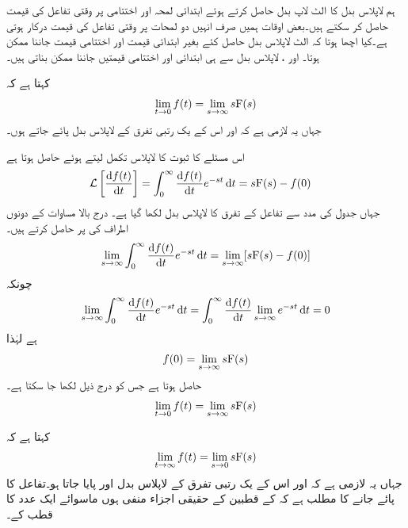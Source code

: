 ہم لاپلاس بدل  کا الٹ لاپ بدل  حاصل کرتے ہوئے ابتدائی لمحہ  اور اختتامی  پر وقتی تفاعل کی قیمت حاصل کر سکتے ہیں۔بعض اوقات ہمیں صرف انہیں دو لمحات پر وقتی تفاعل کی قیمت درکار ہوتی ہے۔کیا اچھا ہوتا کہ الٹ لاپلاس بدل حاصل کئے بغیر ابتدائی قیمت اور اختتامی قیمت جاننا ممکن ہوتا۔ اور ، لاپلاس بدل سے ہی ابتدائی اور اختتامی قیمتیں جاننا ممکن بناتی ہیں۔

 کہتا ہے  کہ
\begin{align}
\lim_{t \to 0} f(t)=\lim_{s \to \infty} s{{\textup{F}}}(s)
\end{align}
جہاں یہ لازمی ہے کہ   اور اس کے یک رتبی تفرق  کے لاپلاس بدل پائے جاتے ہوں۔

اس مسئلے کا ثبوت  کا لاپلاس تکمل لیتے ہوئے حاصل ہوتا ہے
\begin{align*}
\Laplace\left[\frac{\dif f(t)}{\dif t}\right]&=\int_0^{\infty} \frac{\dif f(t)}{\dif t} e^{-st} \dif t=s\bF(s)-f(0)
\end{align*}
جہاں جدول  کی مدد سے تفاعل کے تفرق کا لاپلاس بدل لکھا گیا ہے۔ درج بالا مساوات کے دونوں اطراف کی   پر حاصل کرتے ہیں۔
\begin{align*}
\lim_{s \to \infty}\int_0^{\infty} \frac{\dif f(t)}{\dif t} e^{-st} \dif t=\lim_{s \to \infty}[s\bF(s)-f(0)]
\end{align*}
چونکہ
\begin{align*}
\lim_{s \to \infty}\int_0^{\infty} \frac{\dif f(t)}{\dif t} e^{-st} \dif t=\int_0^{\infty} \frac{\dif f(t)}{\dif t} \lim_{s \to \infty} e^{-st} \dif t=0
\end{align*}
ہے لہٰذا
\begin{align*}
f(0)=\lim_{s \to \infty}s{{\textup{F}}}(s)
\end{align*}
حاصل ہوتا ہے جس کو درج ذیل لکھا جا سکتا ہے۔
\begin{align*}
\lim_{t \to 0}f(t)=\lim_{s \to \infty}s{{\textup{F}}}(s)
\end{align*}
   
 کہتا ہے  کہ
\begin{align}
\lim_{t \to \infty} f(t)=\lim_{s \to 0} s{{\textup{F}}}(s)
\end{align}
جہاں یہ لازمی ہے کہ   اور اس کے یک رتبی تفرق  کے لاپلاس بدل اور  پایا جاتا ہو۔تفاعل کا  پائے جانے کا مطلب ہے کہ  کے قطبین کے حقیقی اجزاء منفی ہوں ماسوائے ایک عدد  کا قطب کے۔


